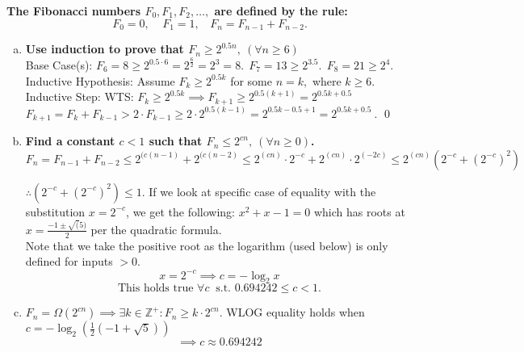 \begin{problem}{0.3}
    \textbf{The Fibonacci numbers $F_0, F_1, F_2, \ldots,$ are defined by the rule:}
    \[
        F_0=0, \ \ \ \ \ 
        F_1=1, \ \ \ \ 
        F_n=F_{n-1}+F_{n-2}.
    \]

    \begin{enumerate}[(a)]
        \item \textbf{Use induction to prove that $F_n \geq 2^{0.5n}, \ (\forall n \geq 6)$}
        \\
        Base Case(s):
        $F_6 = 8 \geq 2^{0.5 \cdot 6} = 2^{\frac{6}{2}} = 2^3 = 8. \ \ F_7=13 \geq 2^{3.5}. \ \ F_8=21 \geq 2^4.$
        \\
        Inductive Hypothesis:
        Assume $F_k\geq2^{0.5k}$ for some $n=k,$ where $k\geq6$.
        \\
        Inductive Step:
        WTS: $F_k\geq2^{0.5k}
        \implies
        F_{k+1}\geq2^{0.5(k+1)}
        =2^{0.5k+0.5}$
        \\
        $F_{k+1}=F_{k}+F_{k-1}
        > 2\cdot F_{k-1}
        \geq 2\cdot 2^{0.5(k-1)}
        = 2^{0.5k-0.5+1} 
        = \boxed{2^{0.5k+0.5}} \ .$
        \qed
        
        \item \textbf{Find a constant $c < 1$ such that $F_n \leq 2^{cn}, \  (\forall n \geq 0)$.}
        \\
        $F_n = F_{n-1} + F_{n-2} 
        \leq 2^{(c(n-1)} + 2^{(c(n-2)} 
        \leq 2^{(cn)} \cdot 2^{-c} + 2^{(cn)} \cdot 2^{(-2c)} 
        \leq 2^{(cn)} (2^{-c} + (2^{-c})^2)$
        
        $\therefore (2^{-c} + (2^{-c})^2) \leq 1$. If we look at specific case of equality with the substitution $x=2^{-c}$, we get the following: $x^2 + x - 1 = 0$
        which has roots at $x = \frac{-1 \pm \sqrt(5)}{2}$ per the quadratic formula.
        \\
        Note that we take the positive root as the logarithm (used below) is only defined for inputs $>0$.
        \[
            x=2^{-c}
            \implies
            c = -\log_2 x
        \]
        \[
            \boxed{\text{This holds true }\forall c \ \text{ s.t. } 0.694242 \leq c < 1}.
        \]
        
        \item $F_n=\Omega(2^{cn})\implies\exists k\in\mathbb Z^+: F_n \geq k\cdot 2^{cn}$.
        WLOG equality holds when $c=-\log_2(\frac12 (-1 + \sqrt{5}))$
        \[
            \implies
            \boxed{c \approx 0.694242}
        \]
    \end{enumerate}
\end{problem}

